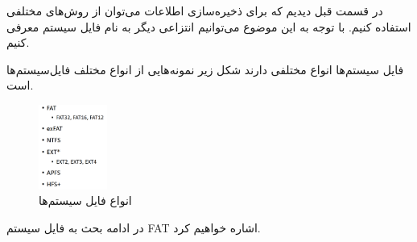 \begin{flushright}
    در قسمت قبل دیدیم که برای ذخیره‌سازی اطلاعات می‌توان از روش‌های مختلفی استفاده کنیم.
    با توجه به این موضوع می‌توانیم انتزاعی دیگر به نام فایل سیستم معرفی کنیم.

فایل سیستم‌ها انواع مختلفی دارند شکل زیر نمونه‌هایی از انواع مختلف فایل‌سیستم‌ها است.

    \begin{figure}[H]
        \centering
        \includegraphics[width=0.2\textwidth]{source/file-system-examples}
        \caption{انواع فایل سیستم‌ها}
        \label{fig:file-system-examples}
    \end{figure}

    در ادامه بحث به فایل سیستم FAT اشاره خواهیم کرد.

\end{flushright}